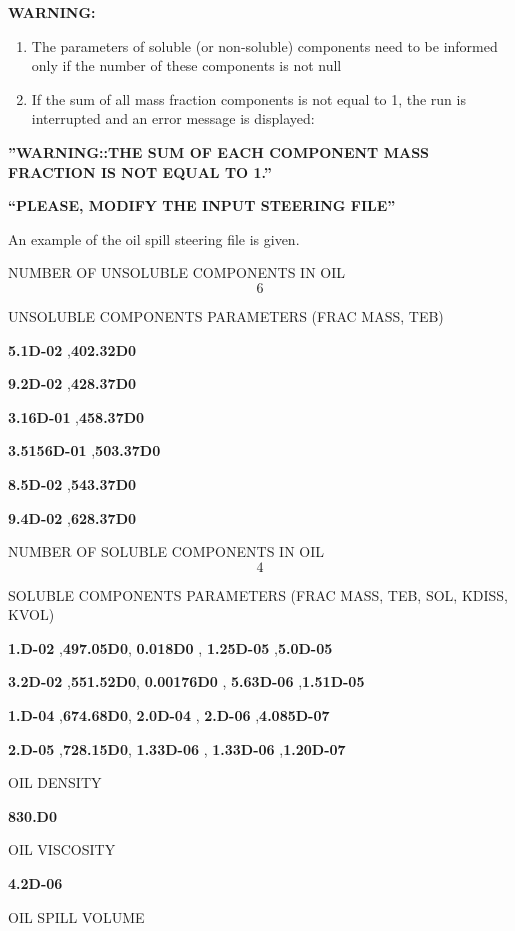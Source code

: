 \documentclass{article} %
\begin{document}
 \textbf{WARNING:}

\begin{enumerate}
\item \textbf{ }The parameters of soluble (or non-soluble) components need to be informed only if the number of these components is not null

\item  If the sum of all mass fraction components is not equal to 1, the run is interrupted and an error message is displayed:
\end{enumerate}

 \textbf{''WARNING::THE SUM OF EACH COMPONENT MASS FRACTION IS NOT EQUAL TO 1.''}

 \textbf{``PLEASE, MODIFY THE INPUT STEERING FILE''}

 An example of the oil spill steering file is given.

NUMBER OF UNSOLUBLE COMPONENTS IN OIL
\[6\]

UNSOLUBLE COMPONENTS PARAMETERS (FRAC MASS, TEB)

\textbf{5.1D-02}    ,\textbf{402.32D0}

\textbf{9.2D-02}    ,\textbf{428.37D0}

\textbf{3.16D-01}   ,\textbf{458.37D0}

\textbf{3.5156D-01}    ,\textbf{503.37D0}

\textbf{8.5D-02}       ,\textbf{543.37D0}

\textbf{9.4D-02}       ,\textbf{628.37D0}

NUMBER OF SOLUBLE COMPONENTS IN OIL
\[4\]

SOLUBLE COMPONENTS PARAMETERS (FRAC MASS, TEB, SOL, KDISS, KVOL)

\textbf{1.D-02}   ,\textbf{497.05D0},  \textbf{0.018D0}   , \textbf{1.25D-05} ,\textbf{5.0D-05}

\textbf{3.2D-02}  ,\textbf{551.52D0},  \textbf{0.00176D0} , \textbf{5.63D-06} ,\textbf{1.51D-05}

\textbf{1.D-04}   ,\textbf{674.68D0},  \textbf{2.0D-04}   , \textbf{2.D-06}   ,\textbf{4.085D-07}

\textbf{2.D-05}   ,\textbf{728.15D0},  \textbf{1.33D-06}  , \textbf{1.33D-06} ,\textbf{1.20D-07}

OIL DENSITY

\textbf{830.D0}

OIL VISCOSITY

\textbf{4.2D-06}

OIL SPILL VOLUME
\end{document}
